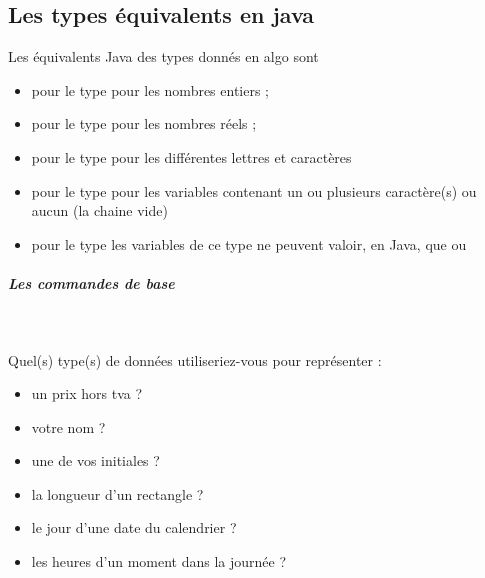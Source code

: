 \documentclass[11pt,a4paper]{article}
\begin{document}
				\subsection{Les types \'equivalents en java}
          Les \'equivalents Java des types donn\'es en algo sont
          
					\begin{itemize}
				
			\item \verb@int@ pour le type \verb@entier@ pour les nombres entiers ;
			\item \verb@double@ pour le type  pour les nombres r\'eels ;
			\item \verb@char@ pour le type  pour les diff\'erentes lettres et caract\`eres
			\item \verb@String@ pour le type \verb@chaine@ 
              pour les variables contenant un ou plusieurs caract\`ere(s) ou aucun (la chaine vide)
            
			\item \verb@boolean@ pour le type  les variables de ce type 
            ne peuvent valoir, en Java, que \verb@true@ ou \verb@false@
					\end{itemize}
				
            \par
        
			
		\subparagraph{Les commandes de base} 
		
                \textcolor{white}{.} \par
             
								Quel(s) type(s) de donn\'ees utiliseriez-vous pour repr\'esenter :
							
					\begin{itemize}
				
			\item un prix hors tva ? \textcolor{gray}{\underline{\hspace*{5em}}} 
			\item votre nom ?  \textcolor{gray}{\underline{\hspace*{5em}}} 
			\item une de vos initiales ? \textcolor{gray}{\underline{\hspace*{3em}}} 
			\item la longueur d'un rectangle ?  \textcolor{gray}{\underline{\hspace*{5em}}} 
			\item le jour d'une date du calendrier ?  \textcolor{gray}{\underline{\hspace*{2em}}} 
			\item les heures d'un moment dans la journ\'ee ?  \textcolor{gray}{\underline{\hspace*{2em}}} 
					\end{itemize}
\end{document}
